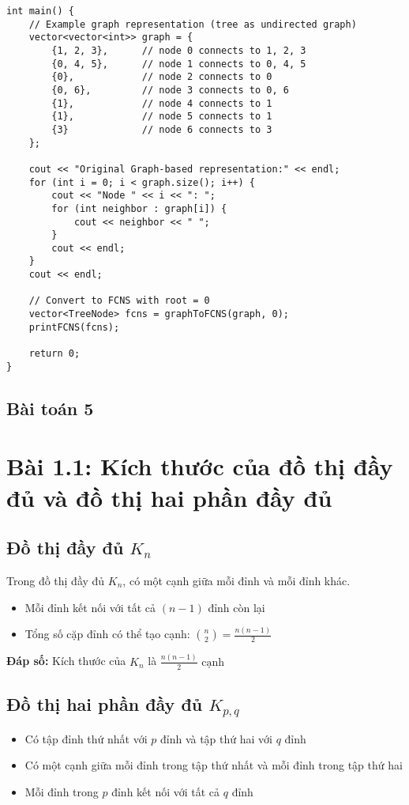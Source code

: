 \documentclass[12pt]{article}
\begin{document}
\begin{lstlisting}[caption={Chuyển đổi từ Graph-based Representation sang First-Child Next-Sibling}]
int main() {
    // Example graph representation (tree as undirected graph)
    vector<vector<int>> graph = {
        {1, 2, 3},      // node 0 connects to 1, 2, 3
        {0, 4, 5},      // node 1 connects to 0, 4, 5
        {0},            // node 2 connects to 0
        {0, 6},         // node 3 connects to 0, 6
        {1},            // node 4 connects to 1
        {1},            // node 5 connects to 1
        {3}             // node 6 connects to 3
    };
    
    cout << "Original Graph-based representation:" << endl;
    for (int i = 0; i < graph.size(); i++) {
        cout << "Node " << i << ": ";
        for (int neighbor : graph[i]) {
            cout << neighbor << " ";
        }
        cout << endl;
    }
    cout << endl;
    
    // Convert to FCNS with root = 0
    vector<TreeNode> fcns = graphToFCNS(graph, 0);
    printFCNS(fcns);
    
    return 0;
}
\end{lstlisting}
\subsection{Bài toán 5}
\section{Bài 1.1: Kích thước của đồ thị đầy đủ và đồ thị hai phần đầy đủ}

\subsection{Đồ thị đầy đủ $K_n$}
Trong đồ thị đầy đủ $K_n$, có một cạnh giữa mỗi đỉnh và mỗi đỉnh khác.
\begin{itemize}
    \item Mỗi đỉnh kết nối với tất cả $(n-1)$ đỉnh còn lại
    \item Tổng số cặp đỉnh có thể tạo cạnh: $\binom{n}{2} = \frac{n(n-1)}{2}$
\end{itemize}

\textbf{Đáp số:} Kích thước của $K_n$ là $\boxed{\frac{n(n-1)}{2} \text{ cạnh}}$

\subsection{Đồ thị hai phần đầy đủ $K_{p,q}$}
\begin{itemize}
    \item Có tập đỉnh thứ nhất với $p$ đỉnh và tập thứ hai với $q$ đỉnh
    \item Có một cạnh giữa mỗi đỉnh trong tập thứ nhất và mỗi đỉnh trong tập thứ hai
    \item Mỗi đỉnh trong $p$ đỉnh kết nối với tất cả $q$ đỉnh
\end{itemize}
\end{document}
